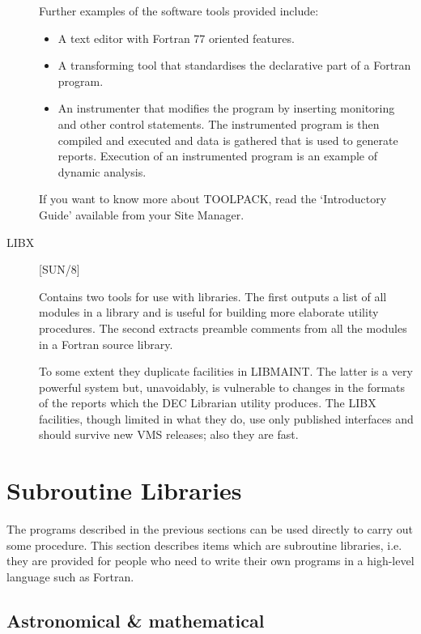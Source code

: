 \begin{description}
Further examples of the software tools provided include:
\begin{itemize}
\item A text editor with Fortran 77 oriented features.
\item A transforming tool that standardises the declarative part of a Fortran
program.
\item An instrumenter that modifies the program by inserting monitoring
and other control statements.
The instrumented program is then compiled and executed and data is gathered that
is used to generate reports.
Execution of an instrumented program is an example of dynamic analysis.
\end{itemize}
If you want to know more about TOOLPACK, read the `Introductory Guide'
available from your Site Manager.

\item [LIBX] \hfill [SUN/8]

Contains two tools for use with libraries.
The first outputs a list of all modules in a library and is useful for building
more elaborate utility procedures.
The second extracts preamble comments from all the modules in a Fortran
source library.

To some extent they duplicate facilities in LIBMAINT.
The latter is a very powerful system but, unavoidably, is vulnerable to
changes in the formats of the reports which the DEC Librarian utility produces.
The LIBX facilities, though limited in what they do, use only published
interfaces and should survive new VMS releases; also they are fast.

\end{description}

\newpage

\section {Subroutine Libraries}

The programs described in the previous sections can be used directly to carry
out some procedure.
This section describes items which are subroutine libraries, i.e. they are
provided for people who need to write their own programs in a high-level
language such as Fortran.

\subsection{Astronomical \& mathematical}

